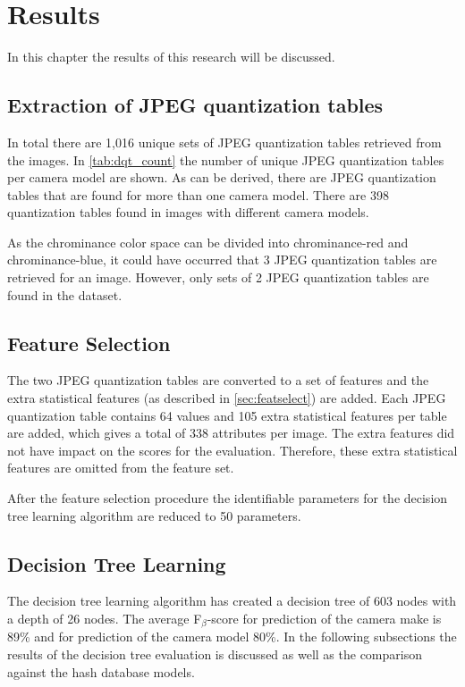 
\chapter{Results} %

\label{ch:results} %

In this chapter the results of this research will be discussed. %

\section{Extraction of JPEG quantization tables}
In total there are 1,016 unique sets of JPEG quantization tables retrieved from the images. In \autoref{tab:dqt_count} the number of unique JPEG quantization tables per camera model are shown. As can be derived, there are JPEG quantization tables that are found for more than one camera model. There are 398 quantization tables found in images with different camera models. 

As the chrominance color space can be divided into chrominance-red and chrominance-blue, it could have occurred that 3 JPEG quantization tables are retrieved for an image. However, only sets of 2 JPEG quantization tables are found in the dataset.

\section{Feature Selection}
The two JPEG quantization tables are converted to a set of features and the extra statistical features (as described in \autoref{sec:featselect}) are added. Each JPEG quantization table contains 64 values and 105 extra statistical features per table are added, which gives a total of 338 attributes per image. The extra features did not have impact on the scores for the evaluation. Therefore, these extra statistical features are omitted from the feature set.

After the feature selection procedure the identifiable parameters for the decision tree learning algorithm are reduced to 50 parameters. 

\section{Decision Tree Learning}
The decision tree learning algorithm has created a decision tree of 603 nodes with a depth of 26 nodes. The average F$_\beta$-score for prediction of the camera make is 89\% and for prediction of the camera model 80\%. In the following subsections the results of the decision tree evaluation is discussed as well as the comparison against the hash database models.

